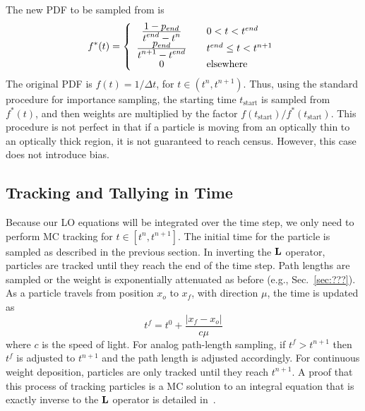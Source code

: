 The new PDF to be sampled from is
\begin{equation}
    f^*(t) = \left\{ \begin{array}{cl}
        \frac{\displaystyle 1 - p_{end}}{\displaystyle t^{end} - t^n} &\quad 0 < t < t^{end} \\ 
        \frac{\displaystyle p_{end}}{\displaystyle t^{n+1} - t^{end}} & \quad t^{end} \leq t < t^{n+1}  \\
        0 & \quad \text{elsewhere}\end{array}  \right.
\end{equation}
The original PDF is $f(t)= 1/\Delta t$, for $t\in(t^{n},t^{n+1})$.  Thus, using the
standard procedure for importance sampling\cite{shultis_mc}, the starting time $t_{\text{start}}$ is sampled from
$f^*(t)$, and then weights are multiplied by the factor
$f(t_{\text{start}})/f^*(t_{\text{start}})$.  This procedure is not perfect in that if a
particle is moving from an optically thin to an optically thick
region, it is not guaranteed to reach census. However, this case does not introduce bias.

\subsection{Tracking and Tallying in Time}

Because our LO equations will be integrated over the time step, we only need to
perform MC tracking for $t\in[t^{n},t^{n+1}]$.  
The initial time for the particle is
sampled as described in the previous section. In inverting the $\mathbf{L}$ operator, particles
are tracked until they reach the end of the time step.  Path lengths are sampled or the
weight is exponentially attenuated as before (e.g., Sec.~\ref{sec:???}).  As a particle
travels from position $x_{o}$ to $x_{f}$, with direction $\mu$, the time is updated as 
\begin{equation}
    t^{f} = t^{0} + \frac{|x_{f} - x_{o}|}{c \mu}
\end{equation}
where $c$ is the speed of light. For analog path-length sampling, if $t^{f}>t^{n+1}$ then $t^{f}$ is adjusted to $t^{n+1}$
and the path length is adjusted accordingly.  For continuous weight deposition, particles
are only tracked until they reach $t^{n+1}$.  A proof that this process of tracking
particles is a MC solution to an integral equation that is exactly inverse to the $\mathbf{L}$ operator is
detailed in~\cite{cj_thesis,shultis_paper_cj_cites???}.  

